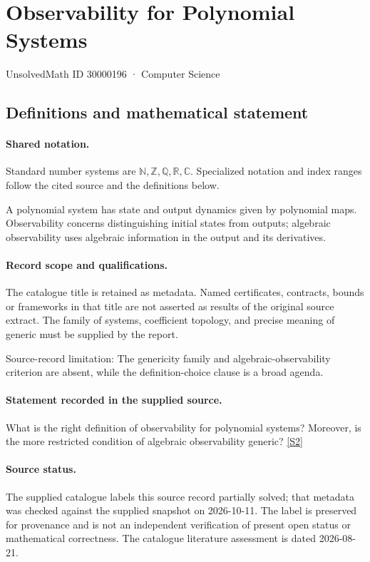 \documentclass[11pt]{article}
\newcommand{\sref}[2]{\hyperlink{source:#1:#2}{[S#2]}}
\begin{document}
\setcounter{section}{30000195}
\section{Observability for Polynomial Systems}\label{30000196}
{\small\sffamily UnsolvedMath ID 30000196 · Computer Science}
\subsection{Definitions and mathematical statement}

\paragraph{Shared notation.}Standard number systems are $\mathbb N,\mathbb Z,\mathbb Q,\mathbb R,\mathbb C$. Specialized notation and index ranges follow the cited source and the definitions below.


A polynomial system has state and output dynamics given by polynomial maps. Observability concerns distinguishing initial states from outputs; algebraic observability uses algebraic information in the output and its derivatives.
\paragraph{Record scope and qualifications.}
The catalogue title is retained as metadata. Named certificates, contracts, bounds or frameworks in that title are not asserted as results of the original source extract.
The family of systems, coefficient topology, and precise meaning of generic must be supplied by the report.

Source-record limitation: The genericity family and algebraic-observability criterion are absent, while the definition-choice clause is a broad agenda.
\paragraph{Statement recorded in the supplied source.}
What is the right definition of observability for polynomial systems? Moreover, is the more restricted condition of algebraic observability generic? \sref{30000196}{2}
\paragraph{Source status.}
The supplied catalogue labels this source record partially solved; that metadata was checked against the supplied snapshot on 2026-10-11. The label is preserved for provenance and is not an independent verification of present open status or mathematical correctness. The catalogue literature assessment is dated 2026-08-21.
\end{document}
